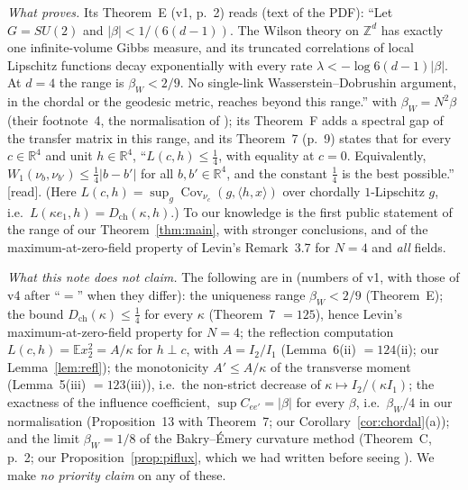\documentclass[11pt,a4paper]{article}
\theoremstyle{remark}
\theoremstyle{definition}
\theoremstyle{plain}
\theoremstyle{remark}
\newcommand{\R}{\mathbb{R}}
\newcommand{\E}{\mathbb{E}}
\newcommand{\Cov}{\operatorname{Cov}}
\newcommand{\st}[1]{\textsf{[#1]}}
\newcommand{\Dch}{D_{\mathrm{ch}}}
\begin{document}
\emph{What \cite{BB26} proves.} Its Theorem~E (v1, p.~2) reads (text of the PDF): ``Let $G=SU(2)$ and $|\beta|<1/(6(d-1))$. The Wilson theory on $\mathbb Z^d$
has exactly one infinite-volume Gibbs measure, and its truncated correlations of local Lipschitz functions decay
exponentially with every rate $\lambda<-\log 6(d-1)|\beta|$. At $d=4$ the range is $\beta_W<2/9$. No single-link
Wasserstein--Dobrushin argument, in the chordal or the geodesic metric, reaches beyond this range.'' with
$\beta_W=N^2\beta$ (their footnote~4, the normalisation of \cite{SZZ23}); its Theorem~F adds a spectral gap of the
transfer matrix in this range, and its Theorem~7 (p.~9) states that for every $c\in\R^4$ and unit $h\in\R^4$,
``$L(c,h)\le\frac14$, with equality at $c=0$. Equivalently, $W_1(\nu_b,\nu_{b'})\le\frac14|b-b'|$ for all
$b,b'\in\R^4$, and the constant $\frac14$ is the best possible.'' \st{read}. (Here $L(c,h)=\sup_g\Cov_{\nu_c}(g,\langle h,x\rangle)$ over chordally $1$-Lipschitz $g$,
i.e.\ $L(\kappa e_1,h)=\Dch(\kappa,h)$.) To our knowledge \cite{BB26} is the
first public statement of the range of our Theorem~\ref{thm:main}, with stronger conclusions, and of the
maximum-at-zero-field property of Levin's Remark~3.7 for $N=4$ and \emph{all} fields.

\emph{What this note does not claim.} The following are in \cite{BB26} (numbers of v1, with those of v4 after ``$=$'' when they differ): the uniqueness range $\beta_W<2/9$ (Theorem~E);
the bound $\Dch(\kappa)\le\frac14$ for every $\kappa$ (Theorem~7 $=125$), hence Levin's maximum-at-zero-field property for $N=4$; the reflection computation $L(c,h)=\E x_2^2=A/\kappa$ for $h\perp c$, with $A=I_2/I_1$
(Lemma~6(ii) $=124$(ii); our Lemma~\ref{lem:refl}); the monotonicity $A'\le A/\kappa$ of the transverse moment (Lemma~5(iii) $=123$(iii)), i.e.\ the non-strict decrease of $\kappa\mapsto I_2/(\kappa I_1)$;
the exactness of the influence coefficient, $\sup C_{ee'}=|\beta|$ for every $\beta$, i.e.\ $\beta_W/4$ in our normalisation (Proposition~13 with Theorem~7; our Corollary~\ref{cor:chordal}(a));
and the limit $\beta_W=1/8$ of the Bakry--\'Emery curvature method (Theorem~C, p.~2; our Proposition~\ref{prop:piflux}, which we had written before seeing \cite{BB26}).
We make \emph{no priority claim} on any of these.
\end{document}
